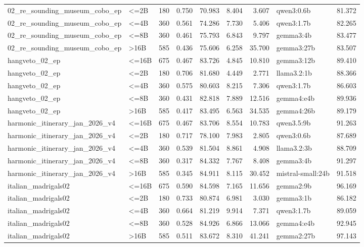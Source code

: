 \begin{tabular}{llrrrrrlr}
02\_re\_sounding\_museum\_cobo\_ep & <=2B & 180 & 0.750 & 70.983 & 8.404 & 3.607 & qwen3:0.6b & 81.372 \\
02\_re\_sounding\_museum\_cobo\_ep & <=4B & 360 & 0.561 & 74.286 & 7.730 & 5.406 & qwen3:1.7b & 82.265 \\
02\_re\_sounding\_museum\_cobo\_ep & <=8B & 360 & 0.461 & 75.793 & 6.843 & 9.797 & gemma3:4b & 83.477 \\
02\_re\_sounding\_museum\_cobo\_ep & >16B & 585 & 0.436 & 75.606 & 6.258 & 35.700 & gemma3:27b & 83.507 \\
hangveto\_02\_ep & <=16B & 675 & 0.467 & 83.726 & 4.845 & 10.810 & gemma3:12b & 89.410 \\
hangveto\_02\_ep & <=2B & 180 & 0.706 & 81.680 & 4.449 & 2.771 & llama3.2:1b & 88.366 \\
hangveto\_02\_ep & <=4B & 360 & 0.575 & 80.603 & 8.215 & 7.306 & qwen3:1.7b & 86.603 \\
hangveto\_02\_ep & <=8B & 360 & 0.431 & 82.818 & 7.889 & 12.516 & gemma4:e4b & 89.936 \\
hangveto\_02\_ep & >16B & 585 & 0.417 & 83.495 & 6.563 & 34.535 & gemma4:26b & 89.179 \\
harmonic\_itinerary\_jan\_2026\_v4 & <=16B & 675 & 0.467 & 83.706 & 8.554 & 10.783 & qwen3.5:9b & 91.263 \\
harmonic\_itinerary\_jan\_2026\_v4 & <=2B & 180 & 0.717 & 78.100 & 7.983 & 2.805 & qwen3:0.6b & 87.689 \\
harmonic\_itinerary\_jan\_2026\_v4 & <=4B & 360 & 0.539 & 81.504 & 8.861 & 4.908 & llama3.2:3b & 88.709 \\
harmonic\_itinerary\_jan\_2026\_v4 & <=8B & 360 & 0.317 & 84.332 & 7.767 & 8.408 & gemma3:4b & 91.297 \\
harmonic\_itinerary\_jan\_2026\_v4 & >16B & 585 & 0.345 & 84.911 & 8.115 & 30.452 & mistral-small:24b & 91.518 \\
italian\_madrigals02 & <=16B & 675 & 0.590 & 84.598 & 7.165 & 11.656 & gemma2:9b & 96.169 \\
italian\_madrigals02 & <=2B & 180 & 0.733 & 80.874 & 6.981 & 3.030 & gemma3:1b & 86.182 \\
italian\_madrigals02 & <=4B & 360 & 0.664 & 81.219 & 9.914 & 7.371 & qwen3:1.7b & 89.059 \\
italian\_madrigals02 & <=8B & 360 & 0.528 & 84.926 & 6.866 & 13.066 & gemma4:e4b & 92.945 \\
italian\_madrigals02 & >16B & 585 & 0.511 & 83.672 & 8.310 & 41.241 & gemma2:27b & 97.143 \\

\end{tabular}
